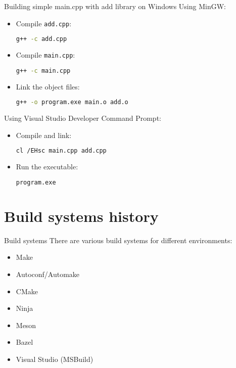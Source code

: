 \documentclass{beamer}
\begin{document}
\begin{frame}[fragile]{Building simple main.cpp with add library on Windows}
  Using MinGW\@:
  \begin{itemize}
    \item Compile \texttt{add.cpp}:
    \begin{lstlisting}[language=bash]
g++ -c add.cpp
    \end{lstlisting}
    \item Compile \texttt{main.cpp}:
    \begin{lstlisting}[language=bash]
g++ -c main.cpp
    \end{lstlisting}
    \item Link the object files:
    \begin{lstlisting}[language=bash]
g++ -o program.exe main.o add.o
    \end{lstlisting}
  \end{itemize}

  Using Visual Studio Developer Command Prompt:
  \begin{itemize}
    \item Compile and link:
    \begin{lstlisting}[language=bash]
cl /EHsc main.cpp add.cpp
    \end{lstlisting}
    \item Run the executable:
    \begin{lstlisting}[language=bash]
program.exe
    \end{lstlisting}
  \end{itemize}
\end{frame}

\section{Build systems history}

\begin{frame}{Build systems}
  There are various build systems for different environments:

  \begin{itemize}
    \item Make
    \item Autoconf/Automake
    \item CMake
    \item Ninja
    \item Meson
    \item Bazel
    \item Visual Studio (MSBuild)
  \end{itemize}
\end{frame}
\end{document}
